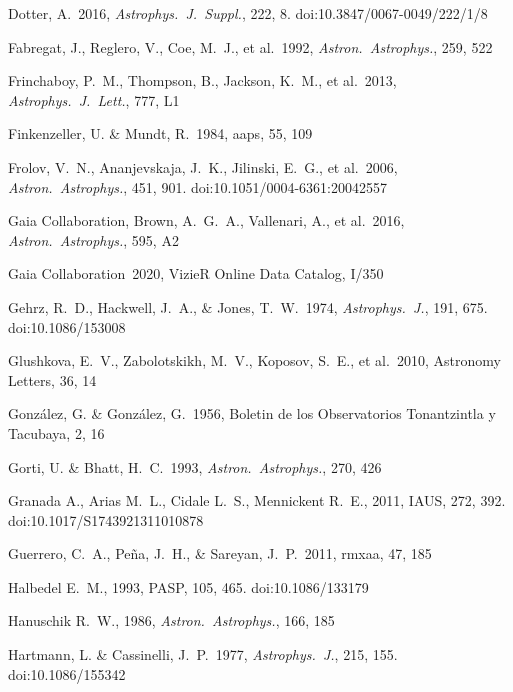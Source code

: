 \documentclass{jaa}
\def\apjs{{\it Astrophys.~J.~Suppl.}}
\def\apj{{\it Astrophys.~J.}}
\def\apjl{{\it Astrophys.~J.~Lett.}}
\def\aap{{\it Astron.~Astrophys.}}
\begin{document}
\begin{thebibliography}{99}
 Dotter, A.\ 2016, \apjs, 222, 8. doi:10.3847/0067-0049/222/1/8

 Fabregat, J., Reglero, V., Coe, M.~J., et al.\ 1992, \aap, 259, 522

 Frinchaboy, P.~M., Thompson, B., Jackson, K.~M., et al.\ 2013, \apjl, 777, L1 

 Finkenzeller, U. \& Mundt, R.\ 1984, aaps, 55, 109

 Frolov, V.~N., Ananjevskaja, J.~K., Jilinski, E.~G., et al.\ 2006, \aap, 451, 901. doi:10.1051/0004-6361:20042557

 Gaia Collaboration, Brown, A.~G.~A., Vallenari, A., et al.\ 2016, \aap, 595, A2 


 Gaia Collaboration\ 2020, VizieR Online Data Catalog, I/350

 Gehrz, R.~D., Hackwell, J.~A., \& Jones, T.~W.\ 1974, \apj, 191, 675. doi:10.1086/153008

 Glushkova, E.~V., Zabolotskikh, M.~V., Koposov, S.~E., et al.\ 2010, Astronomy Letters, 36, 14

 Gonz{\'a}lez, G. \& Gonz{\'a}lez, G.\ 1956, Boletin de los Observatorios Tonantzintla y Tacubaya, 2, 16

 Gorti, U. \& Bhatt, H.~C.\ 1993, \aap, 270, 426

 Granada A., Arias M.~L., Cidale L.~S., Mennickent R.~E., 2011, IAUS, 272, 392. doi:10.1017/S1743921311010878

 Guerrero, C.~A., Pe{\~n}a, J.~H., \& Sareyan, J.~P.\ 2011, rmxaa, 47, 185

 Halbedel E.~M., 1993, PASP, 105, 465. doi:10.1086/133179

 Hanuschik R.~W., 1986, \aap, 166, 185

 Hartmann, L. \& Cassinelli, J.~P.\ 1977, \apj, 215, 155. doi:10.1086/155342


\end{thebibliography}
\end{document}
